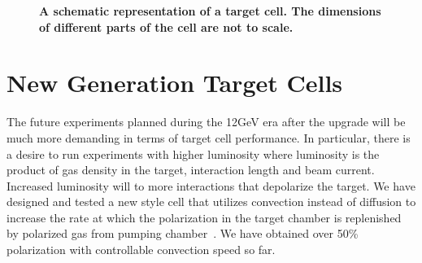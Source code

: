 \begin{figure}[H]
	\centering
	\caption{{\bf A schematic representation of a target cell. The dimensions of different parts of the cell are not to scale.}}
	\label{TargetCell}
\end{figure}

\section{New Generation Target Cells}

The future experiments planned during the 12GeV era after the upgrade will be much more demanding in terms of target cell performance. In particular, there is a desire to run experiments with higher luminosity where luminosity is the product of gas density in the target, interaction length and beam current. Increased luminosity will to more interactions that depolarize the target. We have designed and tested a new style cell that utilizes convection instead of diffusion to increase the rate at which the polarization in the target chamber is replenished by polarized gas from pumping chamber~\cite{PhysRevC.84.065201}. We have obtained over 50\% polarization with controllable convection speed so far.

